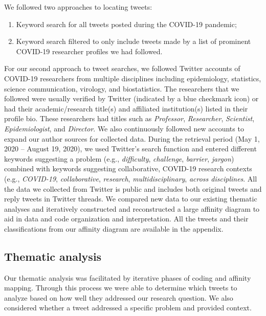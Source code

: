 \documentclass[acmsmall,authordraft]{acmart}
\begin{document}
We followed two approaches to locating tweets: 
\begin{enumerate}
    \item Keyword search for all tweets posted during the COVID-19 pandemic;
    \item Keyword search filtered to only include tweets made by a list of prominent COVID-19 researcher profiles we had followed.
\end{enumerate}    
    
For our second approach to tweet searches, we followed Twitter accounts of COVID-19 researchers from multiple disciplines including epidemiology, statistics, science communication, virology, and biostatistics. The researchers that we followed were usually verified by Twitter (indicated by a blue checkmark icon) or had their academic/research title(s) and affiliated institution(s) listed in their profile bio. These researchers had titles such as \textit{Professor}, \textit{Researcher}, \textit{Scientist}, \textit{Epidemiologist}, and \textit{Director}. We also continuously followed new accounts to expand our author sources for collected data. 
During the retrieval period (May 1, 2020 – August 19, 2020), we used Twitter's search function and entered different keywords suggesting a problem (e.g., \textit{difficulty}, \textit{challenge}, \textit{barrier}, \textit{jargon}) combined with keywords suggesting collaborative, COVID-19 research contexts (e.g., \textit{COVID-19},  \textit{collaborative}, \textit{research}, \textit{multidisciplinary}, \textit{across disciplines}. All the data we collected from Twitter is public and includes both original tweets and reply tweets in Twitter threads. We compared new data to our existing thematic analyses and iteratively constructed and reconstructed a large affinity diagram to aid in data and code organization and interpretation. All the tweets and their classifications from our affinity diagram are available in the appendix.

\subsection{Thematic analysis}
\label{Thematic analysis}
Our thematic analysis was facilitated by iterative phases of coding and affinity mapping. Through this process we were able to determine which tweets to analyze based on how well they addressed our research question. We also considered whether a tweet addressed a specific problem and provided context.
\end{document}

